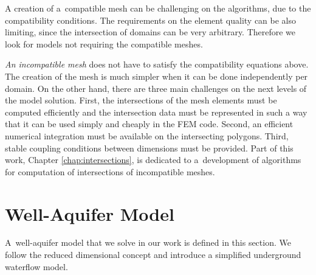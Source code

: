 A creation of a~compatible mesh can be challenging on the algorithms, due to the compatibility conditions.
The requirements on the element quality can be also limiting, since the intersection of domains can be very arbitrary.
Therefore we look for models not requiring the compatible meshes.

\emph{An incompatible mesh} does not have to satisfy the compatibility equations above.
The creation of the mesh is much simpler when it can be done independently per domain.
On the other hand, there are three main challenges on the next levels of the model solution.
First, the intersections of the mesh elements must be computed efficiently and the intersection data
must be represented in such a way that it can be used simply and cheaply in the FEM code.
Second, an efficient numerical integration must be available on the intersecting polygons.
Third, stable coupling conditions between dimensions must be provided.
Part of this work, Chapter \ref{chap:intersections}, is dedicated to a~development of algorithms
for computation of intersections of incompatible meshes.







\newpage
\section{Well-Aquifer Model}
A~well-aquifer model that we solve in our work is defined in this section.
We follow the reduced dimensional concept and introduce a simplified underground waterflow model.

